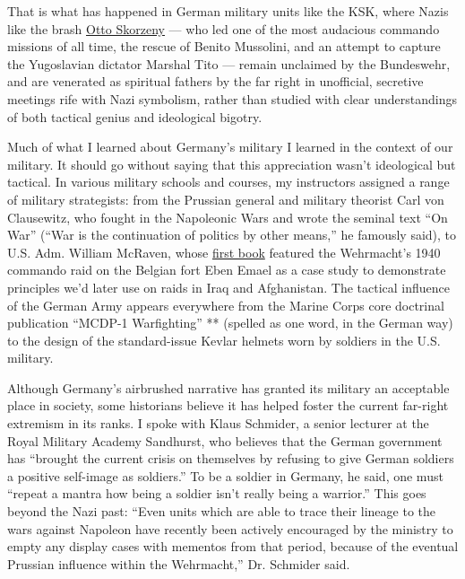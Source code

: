 That is what has happened in German military units like the KSK, where
Nazis like the brash
\href{https://en.wikipedia.org/wiki/Otto_Skorzeny}{Otto Skorzeny} ---
who led one of the most audacious commando missions of all time, the
rescue of Benito Mussolini, and an attempt to capture the Yugoslavian
dictator Marshal Tito --- remain unclaimed by the Bundeswehr, and are
venerated as spiritual fathers by the far right in unofficial, secretive
meetings rife with Nazi symbolism, rather than studied with clear
understandings of both tactical genius and ideological bigotry.

Much of what I learned about Germany's military I learned in the context
of our military. It should go without saying that this appreciation
wasn't ideological but tactical. In various military schools and
courses, my instructors assigned a range of military strategists: from
the Prussian general and military theorist Carl von Clausewitz, who
fought in the Napoleonic Wars and wrote the seminal text ``On War''
(``War is the continuation of politics by other means,'' he famously
said), to U.S. Adm. William McRaven, whose
\href{https://www.penguinrandomhouse.com/books/112624/spec-ops-by-william-h-mcraven/}{first
book} featured the Wehrmacht's 1940 commando raid on the Belgian fort
Eben Emael as a case study to demonstrate principles we'd later use on
raids in Iraq and Afghanistan. The tactical influence of the German Army
appears everywhere from the Marine Corps core doctrinal publication
``MCDP-1 Warfighting'' ** (spelled as one word, in the German way) to
the design of the standard-issue Kevlar helmets worn by soldiers in the
U.S. military.

Although Germany's airbrushed narrative has granted its military an
acceptable place in society, some historians believe it has helped
foster the current far-right extremism in its ranks. I spoke with Klaus
Schmider, a senior lecturer at the Royal Military Academy Sandhurst, who
believes that the German government has ``brought the current crisis on
themselves by refusing to give German soldiers a positive self-image as
soldiers.'' To be a soldier in Germany, he said, one must ``repeat a
mantra how being a soldier isn't really being a warrior.'' This goes
beyond the Nazi past: ``Even units which are able to trace their lineage
to the wars against Napoleon have recently been actively encouraged by
the ministry to empty any display cases with mementos from that period,
because of the eventual Prussian influence within the Wehrmacht,'' Dr.
Schmider said.

